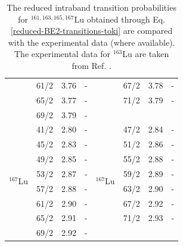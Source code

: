 \begin{table}
\begin{tabular}{|c|c|c|c|c|ccc|}
    & 61/2 & 3.76 & - &  & \multicolumn{1}{c|}{67/2} & \multicolumn{1}{c|}{3.78} & - \\ \cline{2-4} \cline{6-8} 
    & 65/2 & 3.77 & - &  & \multicolumn{1}{c|}{71/2} & \multicolumn{1}{c|}{3.79} & - \\ \cline{2-4} \cline{6-8} 
    & 69/2 & 3.79 & - &  & \multicolumn{3}{c|}{}                                     \\ \hline
    \multirow{8}{*}{$^{167}$Lu} & 41/2 & 2.80 & - & \multirow{8}{*}{$^{167}$Lu} & \multicolumn{1}{c|}{47/2} & \multicolumn{1}{c|}{2.84} & - \\ \cline{2-4} \cline{6-8} 
    & 45/2 & 2.83 & - &  & \multicolumn{1}{c|}{51/2} & \multicolumn{1}{c|}{2.86} & - \\ \cline{2-4} \cline{6-8} 
    & 49/2 & 2.85 & - &  & \multicolumn{1}{c|}{55/2} & \multicolumn{1}{c|}{2.88} & - \\ \cline{2-4} \cline{6-8} 
    & 53/2 & 2.87 & - &  & \multicolumn{1}{c|}{59/2} & \multicolumn{1}{c|}{2.89} & - \\ \cline{2-4} \cline{6-8} 
    & 57/2 & 2.88 & - &  & \multicolumn{1}{c|}{63/2} & \multicolumn{1}{c|}{2.90} & - \\ \cline{2-4} \cline{6-8} 
    & 61/2 & 2.90 & - &  & \multicolumn{1}{c|}{67/2} & \multicolumn{1}{c|}{2.92} & - \\ \cline{2-4} \cline{6-8} 
    & 65/2 & 2.91 & - &  & \multicolumn{1}{c|}{71/2} & \multicolumn{1}{c|}{2.93} & - \\ \cline{2-4} \cline{6-8} 
    & 69/2 & 2.92 & - &  & \multicolumn{3}{c|}{}                                     \\ \hline
    \end{tabular}
    \caption{The reduced intraband transition probabilities for $^{161,163,165,167}$Lu obtained through Eq. \ref{reduced-BE2-transitions-toki} are compared with the experimental data (where available). The experimental data for $^{163}$Lu are taken from Ref. \cite{reich2010nuclear}.}
    \label{table-intraband-E2-numerical-results}
\end{table}
